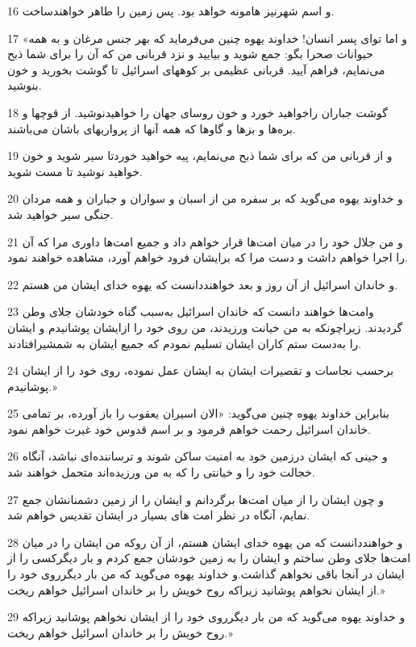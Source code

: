 \par 16 و اسم شهرنیز هامونه خواهد بود. پس زمین را طاهر خواهندساخت.
\par 17 «و اما تو‌ای پسر انسان! خداوند یهوه چنین می‌فرماید که بهر جنس مرغان و به همه حیوانات صحرا بگو: جمع شوید و بیایید و نزد قربانی من که آن را برای شما ذبح می‌نمایم، فراهم آیید. قربانی عظیمی بر کوههای اسرائیل تا گوشت بخورید و خون بنوشید.
\par 18 گوشت جباران راخواهید خورد و خون روسای جهان را خواهیدنوشید. از قوچها و بره‌ها و بزها و گاوها که همه آنها از پرواریهای باشان می‌باشند.
\par 19 و از قربانی من که برای شما ذبح می‌نمایم، پیه خواهید خوردتا سیر شوید و خون خواهید نوشید تا مست شوید.
\par 20 و خداوند یهوه می‌گوید که بر سفره من از اسبان و سواران و جباران و همه مردان جنگی سیر خواهید شد.
\par 21 و من جلال خود را در میان امت‌ها قرار خواهم داد و جمیع امت‌ها داوری مرا که آن را اجرا خواهم داشت و دست مرا که برایشان فرود خواهم آورد، مشاهده خواهند نمود.
\par 22 و خاندان اسرائیل از آن روز و بعد خواهنددانست که یهوه خدای ایشان من هستم.
\par 23 وامت‌ها خواهند دانست که خاندان اسرائیل به‌سبب گناه خودشان جلای وطن گردیدند. زیراچونکه به من خیانت ورزیدند، من روی خود را ازایشان پوشانیدم و ایشان را به‌دست ستم کاران ایشان تسلیم نمودم که جمیع ایشان به شمشیرافتادند.
\par 24 برحسب نجاسات و تقصیرات ایشان به ایشان عمل نموده، روی خود را از ایشان پوشانیدم.»
\par 25 بنابراین خداوند یهوه چنین می‌گوید: «الان اسیران یعقوب را باز آورده، بر تمامی خاندان اسرائیل رحمت خواهم فرمود و بر اسم قدوس خود غیرت خواهم نمود.
\par 26 و حینی که ایشان درزمین خود به امنیت ساکن شوند و ترساننده‌ای نباشد، آنگاه خجالت خود را و خیانتی را که به من ورزیده‌اند متحمل خواهند شد.
\par 27 و چون ایشان را از میان امت‌ها برگردانم و ایشان را از زمین دشمنانشان جمع نمایم، آنگاه در نظر امت های بسیار در ایشان تقدیس خواهم شد.
\par 28 و خواهنددانست که من یهوه خدای ایشان هستم، از آن روکه من ایشان را در میان امت‌ها جلای وطن ساختم و ایشان را به زمین خودشان جمع کردم و بار دیگرکسی را از ایشان در آنجا باقی نخواهم گذاشت.و خداوند یهوه می‌گوید که من بار دیگرروی خود را از ایشان نخواهم پوشانید زیراکه روح خویش را بر خاندان اسرائیل خواهم ریخت.»
\par 29 و خداوند یهوه می‌گوید که من بار دیگرروی خود را از ایشان نخواهم پوشانید زیراکه روح خویش را بر خاندان اسرائیل خواهم ریخت.»

